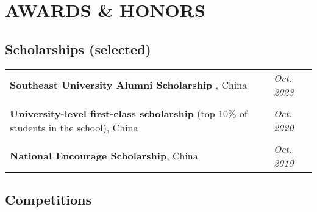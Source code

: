 \documentclass[a4paper,12pt]{article}
\begin{document}
\section{AWARDS \& HONORS}

\subsection*{Scholarships (selected)}

\begin{tabularx}{\linewidth}{@{}l X@{}}

\hspace{0.2cm} \textbf{Southeast University Alumni Scholarship} , China & \hfill \normalsize{\textit{Oct. 2023}}\\
\\
\hspace{0.2cm} \textbf{University-level first-class scholarship} (top 10\% of students in the school), China & \hfill \normalsize{\textit{Oct. 2020}}\\
\\
\hspace{0.2cm} \textbf{National Encourage Scholarship}, China & \hfill \normalsize{\textit{Oct. 2019}}\\
\end{tabularx}


\subsection*{Competitions}
\end{document}
